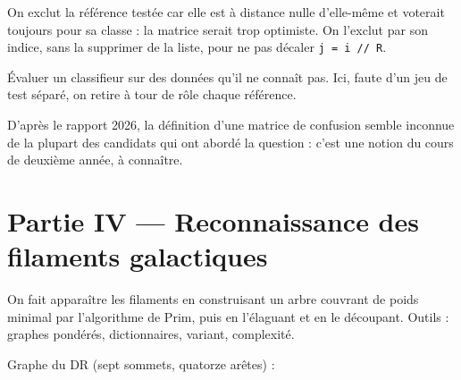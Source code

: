 \documentclass[11pt,a4paper]{article}
\begin{document}
On exclut la référence testée car elle est à distance nulle d'elle-même et voterait toujours pour sa classe : la matrice serait trop optimiste. On l'exclut par son indice, sans la supprimer de la liste, pour ne pas décaler \texttt{j\ =\ i\ //\ R}.

\begin{methode}

Évaluer un classifieur sur des données qu'il ne connaît pas. Ici, faute d'un jeu de test séparé, on retire à tour de rôle chaque référence.

\end{methode}

\begin{jury}

D'après le rapport 2026, la définition d'une matrice de confusion semble inconnue de la plupart des candidats qui ont abordé la question : c'est une notion du cours de deuxième année, à connaître.

\end{jury}

\hypertarget{partie-iv-reconnaissance-des-filaments-galactiques}{%
\section{Partie IV --- Reconnaissance des filaments galactiques}\label{partie-iv-reconnaissance-des-filaments-galactiques}}

On fait apparaître les filaments en construisant un arbre couvrant de poids minimal par l'algorithme de Prim, puis en l'élaguant et en le découpant. Outils : graphes pondérés, dictionnaires, variant, complexité.

Graphe du DR (sept sommets, quatorze arêtes) :
\end{document}
